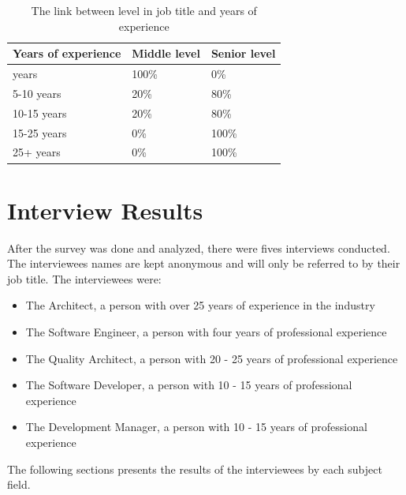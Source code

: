 \documentclass{cslthse-msc}
\begin{document}
    \begin{table}[H]
        \centering
        \caption{The link between level in job title and years of experience}
        \label{tab:experience_level}
        \begin{tabular}{|l|l|l|}
            \hline
            \textbf{Years of experience} & \textbf{Middle level} & \textbf{Senior level} \\ \hline
            \< 5 years           & 100\%         & 0\%           \\ \hline
            5-10 years        & 20\%          & 80\%          \\ \hline
            10-15 years       & 20\%          & 80\%          \\ \hline
            15-25 years       & 0\%           & 100\%         \\ \hline
            25+ years           & 0\%           & 100\%         \\ \hline
        \end{tabular}
    \end{table}

    \section{Interview Results}

    After the survey was done and analyzed, there were fives interviews conducted. The interviewees names are kept anonymous and will only be referred to by their job title. The interviewees were:
    \begin{itemize}[label={-}]
        \item The Architect, a person with over 25 years of experience in the industry
        \item The Software Engineer, a person with four years of professional experience
        \item The Quality Architect, a person with 20 - 25 years of professional experience
        \item The Software Developer, a person with 10 - 15 years of professional experience
        \item The Development Manager, a person with 10 - 15 years of professional experience
    \end{itemize}

    The following sections presents the results of the interviewees by each subject field.
\end{document}
